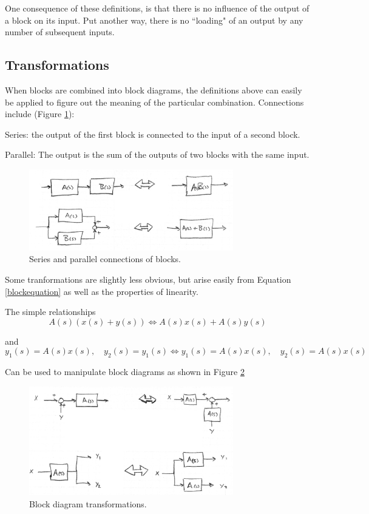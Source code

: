 One consequence of these definitions, is that there is no influence of the output of a block on its input.
Put another way, there is no ``loading" of an output by any number of subsequent inputs.


\subsection{Transformations}

When blocks are combined into block diagrams, the definitions above can easily be applied to figure out the meaning of the particular combination.  Connections include (Figure \ref{serialparallelblocks}):

Series: the output of the first block is connected to the input of a second block.

Parallel:  The output is the sum of the outputs of two blocks with the same input.

\begin{figure}\centering
\includegraphics[width=3.5in]{figs06/00767a.png}
\caption{Series and parallel connections of blocks.}\label{serialparallelblocks}
\end{figure}

Some tranformations are slightly less obvious, but arise easily from Equation \ref{blockequation} as well as the properties of linearity.

The simple relationships
\[
A(s) \left ( x(s)+ y(s) \right) \Leftrightarrow A(s)x(s) + A(s) y(s)
\]

and
\[
y_1(s) = A(s) x(s), \quad y_2(s) = y_1(s)  \Leftrightarrow  y_1(s) = A(s)x(s), \quad y_2(s) = A(s)x(s)
\]

Can be used to manipulate block diagrams as shown in Figure \ref{blocktransforms}

\begin{figure}\centering
\includegraphics[width=3.5in]{figs06/00768a.png}
\caption{Block diagram transformations.}\label{blocktransforms}
\end{figure}

